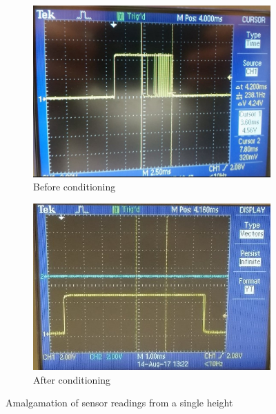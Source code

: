\documentclass[capstone_report.tex]{subfiles}
\begin{document}
    \begin{figure}[H]
        \centering
        \begin{subfigure}[b]{0.45\textwidth}
            \centering
            \includegraphics[width=1\textwidth]{imgs/pulseBroad.jpg}
            \caption{Before conditioning}
            \label{fig:badSig}
        \end{subfigure}%
        \hfill
        \begin{subfigure}[b]{0.45\textwidth}
            \centering
            \includegraphics[width=1\textwidth]{./imgs/pulseOk.jpg}
            \caption{After conditioning\label{fig:goodSig}}
        \end{subfigure}
        \caption{Amalgamation of sensor readings from a single height}
    \end{figure}
\end{document}
